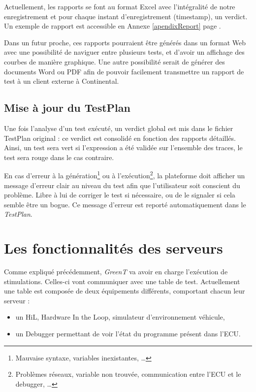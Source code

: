 Actuellement, les rapports se font au format Excel avec l'intégralité de notre enregistrement et pour chaque instant d'enregistrement (timestamp), un verdict. Un
exemple de rapport est accessible en Annexe \ref{apendixReport} page \pageref{apendixReport}. 

Dans un futur proche, ces rapports pourraient être générés dans un format Web avec une possibilité de naviguer entre plusieurs tests, et
d'avoir un affichage des courbes de manière graphique. Une autre possibilité serait de générer des documents Word ou PDF afin de pouvoir facilement transmettre un rapport de test à un client externe à Continental.

\subsection{Mise à jour du TestPlan}
Une fois l'analyse d'un test exécuté, un verdict global est mis dans le fichier TestPlan original : ce verdict est consolidé en fonction des rapports détaillés. Ainsi, un test sera vert si l'expression a été validée sur l'ensemble des traces, le test sera rouge dans le cas contraire.

\begin{remarque}
	En cas d'erreur à la génération\footnote{Mauvaise syntaxe, variables inexistantes, \ldots} ou à l'exécution\footnote{Problèmes réseaux, variable non trouvée, communication entre l'ECU et le debugger, \ldots}, la plateforme doit afficher un message d'erreur clair au niveau du test afin que l'utilisateur soit conscient du problème. Libre à lui de corriger le test si nécessaire, ou de le signaler si cela semble être un bogue. Ce message d'erreur est reporté automatiquement dans le \textit{TestPlan}.
\end{remarque}

\section{Les fonctionnalités des serveurs}\label{wbgt}
Comme expliqué précédemment, \textit{GreenT} va avoir en charge l'exécution de stimulations. Celles-ci vont communiquer avec une table de
test. Actuellement une table est composée de deux équipements différents, comportant chacun leur serveur : 
\begin{itemize}
	\item un HiL, Hardware In the Loop, simulateur d'environnement véhicule,
	\item un Debugger permettant de voir l'état du programme présent dans l'ECU.
\end{itemize}

